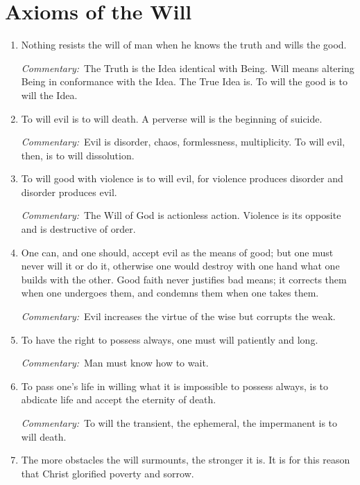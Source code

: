 \section{Axioms of the Will}

\begin{enumerate}[label=\Roman*.]

\item Nothing resists the will of man when he knows the truth and wills the good.

\textit{Commentary:}~The Truth is the Idea identical with Being. Will means altering Being in conformance with the Idea. The True Idea is. To will the good is to will the Idea.

\item To will evil is to will death. A perverse will is the beginning of suicide.

\textit{Commentary:}~Evil is disorder, chaos, formlessness, multiplicity. To will evil, then, is to will dissolution.

\item To will good with violence is to will evil, for violence produces disorder and disorder produces evil.

\textit{Commentary:}~The Will of God is actionless action. Violence is its opposite and is destructive of order.

\item One can, and one should, accept evil as the means of good; but one must never will it or do it, otherwise one would destroy with one hand what one builds with the other. Good faith never justifies bad means; it corrects them when one undergoes them, and condemns them when one takes them.

\textit{Commentary:}~Evil increases the virtue of the wise but corrupts the weak.

\item To have the right to possess always, one must will patiently and long.

\textit{Commentary:}~Man must know how to wait.

\item To pass one's life in willing what it is impossible to possess always, is to abdicate life and accept the eternity of death.

\textit{Commentary:}~To will the transient, the ephemeral, the impermanent is to will death.

\item The more obstacles the will surmounts, the stronger it is. It is for this reason that Christ glorified poverty and sorrow.


\end{enumerate}
